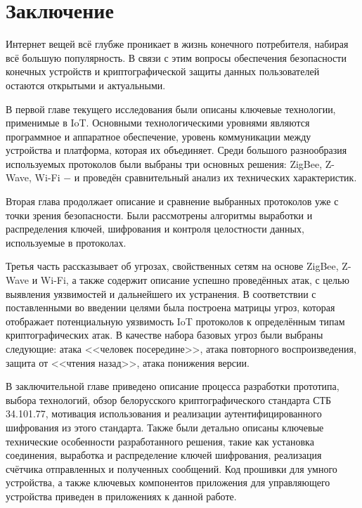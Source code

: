 \chapter*{Заключение}
	
	Интернет вещей всё глубже проникает в жизнь конечного потребителя, набирая всё большую популярность.
	В связи с этим вопросы обеспечения безопасности конечных устройств и криптографической защиты данных
	пользователей остаются открытыми и актуальными.
	
	В первой главе текущего исследования были описаны ключевые технологии, применимые в IoT. Основными
	технологическими уровнями являются программное и аппаратное обеспечение, уровень коммуникации
	между устройства и платформа, которая их объединяет. Среди большого разнообразия используемых
	протоколов были выбраны три основных решения: ZigBee, Z-Wave, Wi-Fi $-$ и проведён сравнительный анализ
	их технических характеристик.
	
	Вторая глава продолжает описание и сравнение выбранных протоколов уже с точки зрения безопасности.
	Были рассмотрены алгоритмы выработки и распределения ключей, шифрования и контроля целостности
	данных, используемые в протоколах.
	
	Третья часть рассказывает об угрозах, свойственных сетям на основе ZigBee, Z-Wave и Wi-Fi, а также
	содержит описание успешно проведённых атак, с целью выявления уязвимостей и дальнейшего их
	устранения. В соответствии с поставленными во введении целями была построена матрицы угроз,
	которая отображает потенциальную уязвимость IoT протоколов к определённым типам криптографических 
	атак. В качестве набора базовых угроз были выбраны следующие: атака <<человек посередине>>,
	атака повторного воспроизведения, защита от <<чтения назад>>, атака понижения версии.
	
	В заключительной главе приведено описание процесса разработки прототипа, выбора технологий,
	обзор белорусского криптографического стандарта СТБ 34.101.77, мотивация использования
	и реализации аутентифицированного шифрования из этого стандарта. Также были детально описаны
	ключевые технические особенности разработанного решения, такие как установка соединения,
	выработка и распределение ключей шифрования, реализация счётчика отправленных и полученных
	сообщений.  Код прошивки для умного устройства, а также ключевых компонентов приложения
	для управляющего устройства приведен в приложениях к данной работе.
	